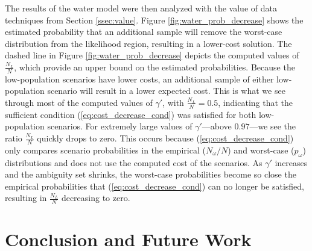 \documentclass[ijoc,nonblindrev]{informs3} %
\begin{document}

The results of the water model were then analyzed with the value of data techniques from Section \ref{ssec:value}.
Figure \ref{fig:water_prob_decrease} shows the estimated probability that an additional sample will remove the worst-case distribution from the likelihood region, resulting in a lower-cost solution. %
The dashed line in Figure \ref{fig:water_prob_decrease} depicts the computed values of $\frac{N_L}{N}$, which provide an upper bound on the estimated probabilities. 
Because the low-population scenarios have lower costs, an additional sample of either low-population scenario will result in a lower expected cost.
This is what we see through most of the computed values of $\gamma'$, with $\frac{N_L}{N} = 0.5$, indicating that the sufficient condition (\ref{eq:cost_decrease_cond}) was satisfied for both low-population scenarios.
For extremely large values of $\gamma'$---above $0.97$---we see the ratio $\frac{N_L}{N}$ quickly drops to zero.
This occurs because (\ref{eq:cost_decrease_cond}) only compares scenario probabilities in the empirical ($N_\omega / N$) and worst-case ($p_\omega$) distributions and does not use the computed cost of the scenarios.
As $\gamma'$ increases and the ambiguity set shrinks, the worst-case probabilities become so close the empirical probabilities that (\ref{eq:cost_decrease_cond}) can no longer be satisfied, resulting in $\frac{N_L}{N}$ decreasing to zero.
% 

\section{Conclusion and Future Work}
\label{sec:concl}
\end{document}
